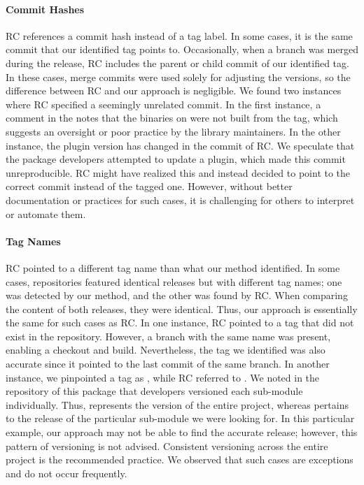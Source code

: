 \documentclass[smallextended]{svjour3}
\newcommand{\maven}[1]{\tool{Maven{#1}}}
\newcommand{\central}{\tool{Maven Central}}
\begin{document}
\paragraph{Commit Hashes} RC references a commit hash instead of a tag label. In some cases, it is the same commit that our identified tag points to. Occasionally, when a branch was merged during the release, RC includes the parent or child commit of our identified tag. In these cases, merge commits were used solely for adjusting the versions, so the difference between RC and our approach is negligible. We found two instances where RC specified a seemingly unrelated commit. In the first instance, a comment in the  notes that the binaries on \central{} were not built from the tag, which suggests an oversight or poor practice by the library maintainers. In the other instance, the \maven{} plugin version has changed in the commit of RC. We speculate that the package developers attempted to update a plugin, which made this commit unreproducible. RC might have realized this and instead decided to point to the correct commit instead of the tagged one. However, without better documentation or practices for such cases, it is challenging for others to interpret or automate them.
%
\paragraph{Tag Names} RC pointed to a different tag name than what our method identified. In some cases, repositories featured identical releases but with different tag names; one was detected by our method, and the other was found by RC. When comparing the content of both releases, they were identical. Thus, our approach is essentially the same for such cases as RC. In one instance, RC pointed to a tag that did not exist in the repository. However, a branch with the same name was present, enabling a checkout and build. Nevertheless, the tag we identified was also accurate since it pointed to the last commit of the same branch. In another instance, we pinpointed a tag as , while RC referred to . We noted in the repository of this package that developers versioned each sub-module individually. Thus,  represents the version  of the entire project, whereas  pertains to the release of the particular sub-module we were looking for. In this particular example, our approach may not be able to find the accurate release; however, this pattern of versioning is not advised. Consistent versioning across the entire project is the recommended practice. We observed that such cases are exceptions and do not occur frequently.
%
\end{document}
